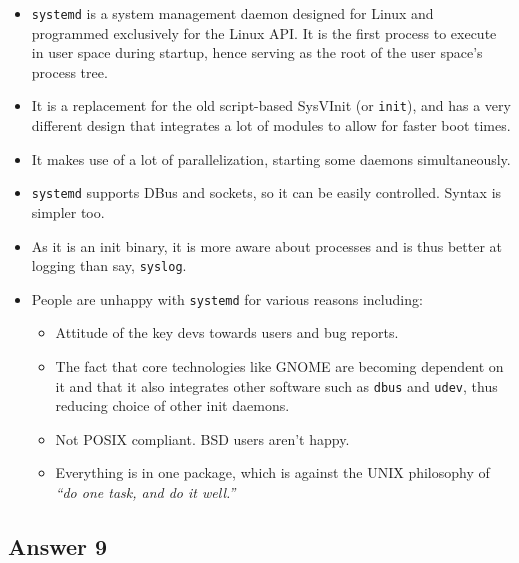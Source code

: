 \documentclass[]{article}
\begin{document}
\begin{itemize}
\itemsep1pt\parskip0pt
\item
  \texttt{systemd} is a system management daemon designed for Linux and
  programmed exclusively for the Linux API. It is the first process to
  execute in user space during startup, hence serving as the root of the
  user space's process tree.
\item
  It is a replacement for the old script-based SysVInit (or
  \texttt{init}), and has a very different design that integrates a lot
  of modules to allow for faster boot times.
\item
  It makes use of a lot of parallelization, starting some daemons
  simultaneously.
\item
  \texttt{systemd} supports DBus and sockets, so it can be easily
  controlled. Syntax is simpler too.
\item
  As it is an init binary, it is more aware about processes and is thus
  better at logging than say, \texttt{syslog}.
\item
  People are unhappy with \texttt{systemd} for various reasons
  including:

  \begin{itemize}
  \itemsep1pt\parskip0pt
  \item
    Attitude of the key devs towards users and bug reports.
  \item
    The fact that core technologies like GNOME are becoming dependent on
    it and that it also integrates other software such as \texttt{dbus}
    and \texttt{udev}, thus reducing choice of other init daemons.
  \item
    Not POSIX compliant. BSD users aren't happy.
  \item
    Everything is in one package, which is against the UNIX philosophy
    of \emph{``do one task, and do it well.''}
  \end{itemize}
\end{itemize}

\subsection{Answer 9}\label{answer-9}
\end{document}
